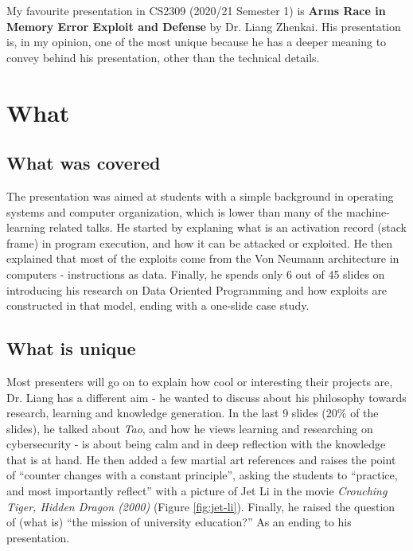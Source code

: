 \documentclass[12pt]{article}
\title{\mytitle}
\author{\myname}
\date{\today}
\theoremstyle{plain}
\begin{document}
\maketitle
My favourite presentation in CS2309 (2020/21 Semester 1) is \textbf{Arms Race in
Memory Error Exploit and Defense} by Dr. Liang Zhenkai. His presentation is, in
my opinion, one of the most unique because he has a deeper meaning to convey
behind his presentation, other than the technical details.

\section{What}
\subsection{What was covered}
\label{subsec:description}
The presentation was aimed at students with a simple background in operating
systems and computer organization, which is lower than many of the
machine-learning related talks. He started by explaning what is an activation
record (stack frame) in program execution, and how it can be attacked or
exploited. He then explained that most of the exploits come from the Von Neumann
architecture in computers - instructions as data. Finally, he spends only 6 out
of 45 slides on introducing his research on Data Oriented Programming and how
exploits are constructed in that model, ending with a one-slide case study.

\subsection{What is unique}
\label{subsec:unique}
Most presenters will go on to explain how cool or interesting their projects
are, Dr. Liang has a different aim - he wanted to discuss about his philosophy
towards research, learning and knowledge generation. In the last 9 slides
($20\%$ of the slides), he talked about \emph{Tao}, and how he views learning
and researching on cybersecurity - is about being calm and in deep reflection
with the knowledge that is at hand. He then added a few martial art references
and raises the point of ``counter changes with a constant principle'', asking
the students to ``practice, and most importantly reflect'' with a picture of Jet
Li in the movie \emph{Crouching Tiger, Hidden Dragon (2000)} (Figure
\ref{fig:jet-li}). Finally, he raised the question of (what is) ``the mission of
university education?'' As an ending to his presentation.
\end{document}
